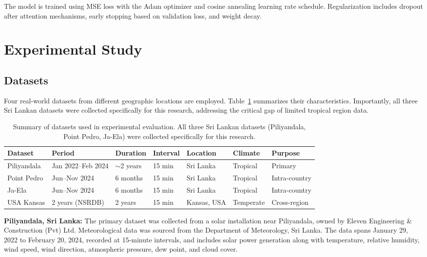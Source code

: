 \documentclass[a4paper,fleqn]{cas-dc}
\begin{document}
The model is trained using MSE loss with the Adam optimizer and cosine annealing learning rate schedule. Regularization includes dropout after attention mechanisms, early stopping based on validation loss, and weight decay.

\section{Experimental Study}\label{sec:experiments}

\subsection{Datasets}

Four real-world datasets from different geographic locations are employed. Table~\ref{tab:datasets} summarizes their characteristics. Importantly, all three Sri Lankan datasets were collected specifically for this research, addressing the critical gap of limited tropical region data.

\begin{table}[width=.9\linewidth,pos=h]
\caption{Summary of datasets used in experimental evaluation. All three Sri Lankan datasets (Piliyandala, Point Pedro, Ja-Ela) were collected specifically for this research.}\label{tab:datasets}
\begin{tabular*}{\tblwidth}{@{} lllllll@{} }
\toprule
\textbf{Dataset} & \textbf{Period} & \textbf{Duration} & \textbf{Interval} & \textbf{Location} & \textbf{Climate} & \textbf{Purpose} \\
\midrule
Piliyandala & Jan 2022--Feb 2024 & $\sim$2 years & 15 min & Sri Lanka & Tropical & Primary \\
Point Pedro & Jun--Nov 2024 & 6 months & 15 min & Sri Lanka & Tropical & Intra-country \\
Ja-Ela & Jun--Nov 2024 & 6 months & 15 min & Sri Lanka & Tropical & Intra-country \\
USA Kansas & 2 years (NSRDB) & 2 years & 15 min & Kansas, USA & Temperate & Cross-region \\
\bottomrule
\end{tabular*}
\end{table}

\textbf{Piliyandala, Sri Lanka:} The primary dataset was collected from a solar installation near Piliyandala, owned by Eleven Engineering \& Construction (Pvt) Ltd. Meteorological data was sourced from the Department of Meteorology, Sri Lanka. The data spans January 29, 2022 to February 20, 2024, recorded at 15-minute intervals, and includes solar power generation along with temperature, relative humidity, wind speed, wind direction, atmospheric pressure, dew point, and cloud cover.
\end{document}
